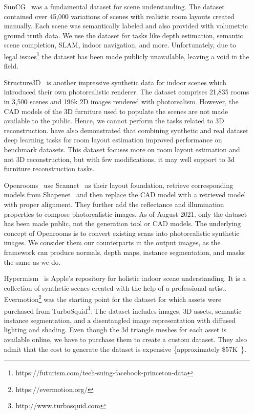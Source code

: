 SunCG~\cite{Song2017SemanticSC} was a fundamental dataset for scene understanding.
The dataset contained over 45,000 variations of scenes with realistic room layouts created manually.
Each scene was semantically labeled and also provided with volumetric ground truth data.
We use the dataset for tasks like depth estimation, semantic scene completion, SLAM, indoor navigation, and more.
Unfortunately, due to legal issues\footnote{https://futurism.com/tech-suing-facebook-princeton-data} the dataset has been made publicly unavailable, leaving a void in the field.

Structure3D~\cite{zheng2020structured3d} is another impressive synthetic data for indoor scenes which introduced their own photorealistic renderer.
The dataset comprises 21,835 rooms in 3,500 scenes and 196k 2D images rendered with photorealism.
However, the CAD models of the 3D furniture used to populate the scenes are not made available to the public.
Hence, we cannot perform the tasks related to  3D reconstruction.
\cite{zheng2020structured3d} have also demonstrated that combining synthetic and real dataset deep learning tasks for room layout estimation improved performance on benchmark datasets.
This dataset focuses more on room layout estimation and not 3D reconstruction, but with few modifications, it may well support to 3d furniture reconstruction tasks.

Openrooms~\cite{Li_2021_CVPR} use Scannet~\cite{Dai2017} as their layout foundation, retrieve corresponding models from Shapenet~\cite{shapenet2015}
and then replace the CAD model with a retrieved model with proper alignment.
They further add the reflectance and illumination properties to compose photorealistic images.
As of August 2021, only the dataset has been made public, not the generation tool or CAD models.
The underlying concept of Openrooms is to convert existing scans into photorealistic synthetic images.
We consider them our counterparts in the output images, as the framework can produce normals, depth maps, instance segmentation, and masks the same as we do.

Hypermism~\cite{Roberts2020HypersimAP} is Apple's repository for holistic indoor scene understanding.
It is a collection of synthetic scenes created with the help of a professional artist.
Evermotion\footnote{https://evermotion.org/} was the starting point for the dataset for which assets were purchased from TurboSquid\footnote{http://www.turbosquid.com}.
The dataset includes images, 3D assets, semantic instance segmentation, and a disentangled image representation with diffused lighting and shading.
Even though the 3d triangle meshes for each asset is available online, we have to purchase them to create a custom dataset.
They also admit that the cost to generate the dataset is expensive \{approximately \$57K~\cite{Roberts2020HypersimAP}\}.

